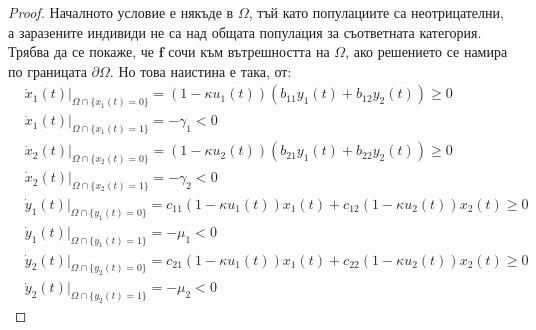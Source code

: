 \begin{proof}
  Началното условие е някъде в $\Omega$, тъй като популациите са неотрицателни, а заразените индивиди не са над общата популация за съответната категория.
  Трябва да се покаже, че $\mathbf{f}$ сочи към вътрешността на $\Omega$, ако решението се намира по границата $\partial \Omega$. Но това наистина е така, от:
  \begin{equation}
    \begin{split}
      &\dot{x}_1(t)\vert_{\Omega \cap \{x_1(t)=0\}} = (1-\kappa u_1(t))(b_{11} y_1(t) + b_{12} y_2(t)) \geq 0 \\
      &\dot{x}_1(t)\vert_{\Omega \cap \{x_1(t)=1\}} = - \gamma_1 < 0 \\
      &\dot{x}_2(t)\vert_{\Omega \cap \{x_2(t)=0\}} = (1-\kappa u_2(t))(b_{21} y_1(t) + b_{22} y_2(t)) \geq 0 \\
      &\dot{x}_2(t)\vert_{\Omega \cap \{x_2(t)=1\}} = - \gamma_2 < 0 \\
      &\dot{y}_1(t)\vert_{\Omega \cap \{y_1(t)=0\}} = c_{11}(1-\kappa u_1(t)) x_1(t) + c_{12}(1-\kappa u_2(t)) x_2(t) \geq 0 \\
      &\dot{y}_1(t)\vert_{\Omega \cap \{y_1(t)=1\}} = - \mu_1 < 0 \\
      &\dot{y}_2(t)\vert_{\Omega \cap \{y_2(t)=0\}} = c_{21}(1-\kappa u_1(t)) x_1(t) + c_{22}(1-\kappa u_2(t)) x_2(t) \geq 0 \\
      &\dot{y}_2(t)\vert_{\Omega \cap \{y_2(t)=1\}} = - \mu_2 < 0
    \end{split}
  \end{equation}
\end{proof}


